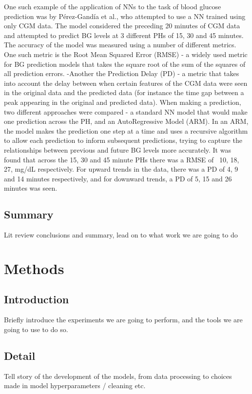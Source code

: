       One such example of the application of NNs to the task of blood glucose prediction was by Pérez-Gandía et al.\cite{paper3}, who attempted to use a NN trained using only CGM data. The model considered the preceding 20 minutes of CGM data and attempted to predict BG levels at 3 different PHs of 15, 30 and 45 minutes. The accuracy of the model was measured using a number of different metrics. One such metric is the Root Mean Squared Error (RMSE) - a widely used metric for BG prediction models that takes the square root of the sum of the squares of all prediction errors. -Another the Prediction Delay (PD) - a metric that takes into account the delay between when certain features of the CGM data were seen in the original data and the predicted data (for instance the time gap between a peak appearing in the original and predicted data). When making a prediction, two different approaches were compared - a standard NN model that would make one prediction across the PH, and an AutoRegressive Model (ARM). In an ARM, the model makes the prediction one step at a time and uses a recursive algorithm to allow each prediction to inform subsequent predictions, trying to capture the relationships between previous and future BG levels more accurately. It was found that across the 15, 30 and 45 minute PHs there was a RMSE of ~10, 18, 27, mg/dL respectively. For upward trends in the data, there was a PD of 4, 9 and 14 minutes respectively, and for downward trends, a PD of 5, 15 and 26 minutes was seen. 


	\subsection{Summary}
            Lit review conclusions and summary, lead on to what work we are going to do

\section{Methods} %
    \subsection{Introduction}
        Briefly introduce the experiments we are going to perform, and the tools we are going to use to do so.
	
	\subsection{Detail}
        Tell story of the development of the models, from data processing to choices made in model hyperparameters / cleaning etc.
	
